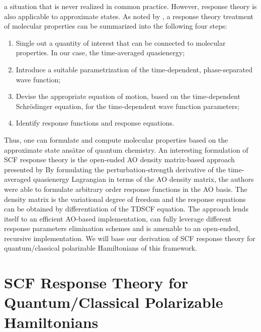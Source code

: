  a situation that is never
realized in common practice. However, response theory is
also applicable to approximate states.
As noted by \citeauthor{Norman2011-ad}, a response theory treatment of
molecular properties can be summarized into the following four
steps:\autocite{Norman2011-ad}
\begin{enumerate}
    \item Single out a quantity of interest that can be connected to
      molecular properties. In our case, the time-averaged
      quasienergy;
    \item Introduce a suitable parametrization of the time-dependent,
      phase-separated wave function;
    \item Devise the appropriate equation of motion, based on the
      time-dependent Schr\"{o}dinger equation, for the time-dependent
      wave function parameters;
    \item Identify response functions and response equations.
\end{enumerate}
Thus, one can formulate and compute molecular properties based on
the approximate state ans\"{a}tze of quantum chemistry.
An interesting formulation of \acrshort{SCF} response theory is the
open-ended \acrshort{AO} density matrix-based approach presented by
\citeauthor{Thorvaldsen2008-sg}\autocite{Thorvaldsen2008-sg}
By formulating the perturbation-strength derivative of the time-averaged
quasienergy Lagrangian in terms of the \acrshort{AO} density matrix,
the authors were able to formulate arbitrary order response functions
in the \acrshort{AO} basis.
The density matrix is the variational degree of freedom and the response
equations can be obtained by differentiation of the \gls{TDSCF}
equation.
The approach lends itself to an efficient \acrshort{AO}-based
implementation,\autocite{Larsen2000-hj, Kjaergaard2008-hy} can fully
leverage different response parameters elimination
schemes\autocite{Thorvaldsen2008-sg, Kristensen2008-hv} and is amenable
to an open-ended, recursive implementation.\autocite{Ringholm2014-gx,
Friese2015-kb, Friese2015-bu}
We will base our derivation of \acrshort{SCF} response theory for
quantum/classical polarizable Hamiltonians of this framework.

\section[Quantum/Classical Polarizable Response Theory]{SCF Response Theory for Quantum/Classical Polarizable Hamiltonians}\label{sec:csm-response}

